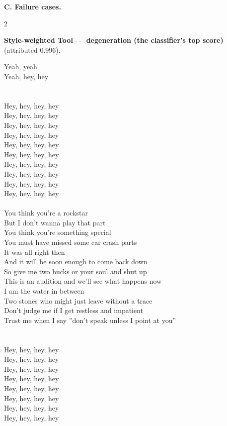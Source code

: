 \newpage
\noindent\textbf{\large C. Failure cases.}\par\medskip
\begin{multicols}{2}\raggedright
\nopagebreak\noindent\textbf{Style-weighted Tool --- degeneration (the classifier's top score)} (attributed 0.996).\par\nopagebreak\vspace{4pt}
{\footnotesize\itshape\raggedright
Yeah, yeah \\
Yeah, hey, hey \\
\mbox{} \\
\mbox{} \\
Hey, hey, hey, hey \\
Hey, hey, hey, hey \\
Hey, hey, hey, hey \\
Hey, hey, hey, hey \\
Hey, hey, hey, hey \\
Hey, hey, hey, hey \\
Hey, hey, hey, hey \\
Hey, hey, hey, hey \\
Hey, hey, hey, hey \\
Hey, hey, hey, hey \\
\mbox{} \\
You think you're a rockstar \\
But I don't wanna play that part \\
You think you're something special \\
You must have missed some car crash parts \\
It was all right then \\
And it will be soon enough to come back down \\
So give me two bucks or your soul and shut up \\
This is an audition and we'll see what happens now \\
I am the water in between \\
Two stones who might just leave without a trace \\
Don't judge me if I get restless and impatient \\
Trust me when I say ''don't speak unless I point at you'' \\
\mbox{} \\
\mbox{} \\
Hey, hey, hey, hey \\
Hey, hey, hey, hey \\
Hey, hey, hey, hey \\
Hey, hey, hey, hey \\
Hey, hey, hey, hey \\
Hey, hey, hey, hey \\
Hey, hey, hey, hey \\
Hey, hey, hey, hey\par}
\medskip


\end{multicols}
